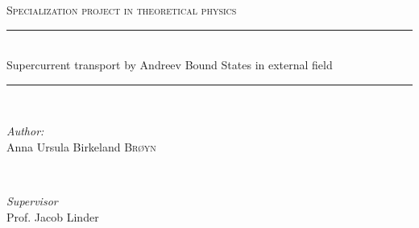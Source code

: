 
\begin{titlepage}

\newcommand{\HRule}{\rule{\linewidth}{0.5mm}} %

\center %
 

\textsc{\LARGE Specialization project in theoretical physics}\\[1.5cm] 


\HRule \\[0.4cm]
{ \huge  Supercurrent transport by Andreev Bound States in external field}\\[0.4cm] %
\HRule \\[1.5cm]
 

\begin{minipage}{0.4\textwidth}
\begin{flushleft} \large
\emph{Author:}\\
Anna Ursula Birkeland \textsc{Br\o yn}\\
\end{flushleft}
\end{minipage}
~
\begin{minipage}{0.4\textwidth}
\begin{flushright} \large
\emph{Supervisor} \\
Prof. Jacob Linder
\end{flushright}
\end{minipage}\\[2cm]



\end{titlepage}
